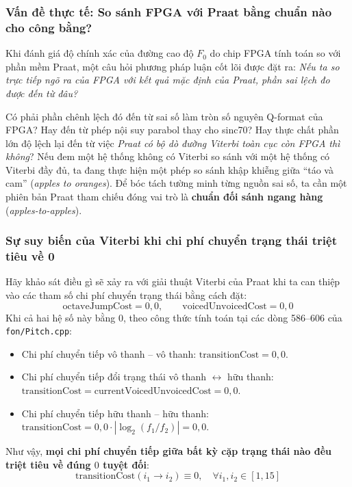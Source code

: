 \subsubsection*{Vấn đề thực tế: So sánh FPGA với Praat bằng chuẩn nào cho công bằng?}
Khi đánh giá độ chính xác của đường cao độ $F_0$ do chip FPGA tính toán so với phần mềm Praat, một câu hỏi phương pháp luận cốt lõi được đặt ra: \emph{Nếu ta so trực tiếp ngõ ra của FPGA với kết quả mặc định của Praat, phần sai lệch đo được đến từ đâu?}

Có phải phần chênh lệch đó đến từ sai số làm tròn số nguyên Q-format của FPGA? Hay đến từ phép nội suy parabol thay cho sinc70? Hay thực chất phần lớn độ lệch lại đến từ việc \emph{Praat có bộ dò đường Viterbi toàn cục còn FPGA thì không}?
Nếu đem một hệ thống không có Viterbi so sánh với một hệ thống có Viterbi đầy đủ, ta đang thực hiện một phép so sánh khập khiễng giữa ``táo và cam'' (\emph{apples to oranges}). Để bóc tách tường minh từng nguồn sai số, ta cần một phiên bản Praat tham chiếu đóng vai trò là \textbf{chuẩn đối sánh ngang hàng} (\emph{apples-to-apples}).

\subsubsection*{Sự suy biến của Viterbi khi chi phí chuyển trạng thái triệt tiêu về 0}
Hãy khảo sát điều gì sẽ xảy ra với giải thuật Viterbi của Praat khi ta can thiệp vào các tham số chi phí chuyển trạng thái bằng cách đặt:
\begin{equation}
    \text{octaveJumpCost} = 0{,}0, \qquad \text{voicedUnvoicedCost} = 0{,}0
\end{equation}
Khi cả hai hệ số này bằng $0$, theo công thức tính toán tại các dòng 586--606 của \texttt{fon/Pitch.cpp}:
\begin{itemize}
    \item Chi phí chuyển tiếp vô thanh -- vô thanh: $\text{transitionCost} = 0{,}0$.
    \item Chi phí chuyển tiếp đổi trạng thái vô thanh $\leftrightarrow$ hữu thanh: $\text{transitionCost} = \text{currentVoicedUnvoicedCost} = 0{,}0$.
    \item Chi phí chuyển tiếp hữu thanh -- hữu thanh: $\text{transitionCost} = 0{,}0 \cdot |\log_2(f_1/f_2)| = 0{,}0$.
\end{itemize}
Như vậy, \textbf{mọi chi phí chuyển tiếp giữa bất kỳ cặp trạng thái nào đều triệt tiêu về đúng $0$ tuyệt đối}:
\begin{equation}
    \text{transitionCost}(i_1 \to i_2) \equiv 0, \quad \forall i_1, i_2 \in [1, 15]
\end{equation}

